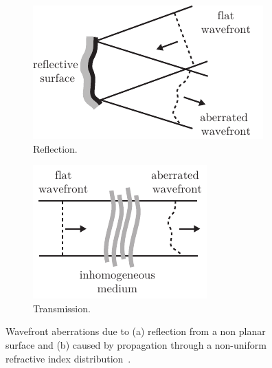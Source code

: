 \begin{figure}[tbh]
       \centering
        \begin{subfigure}[b]{0.4\textwidth}
                \includegraphics[width=\textwidth]{images/wavefront_distortions_reflection}
                \caption{Reflection.}
                \label{fig:abberation_reflection}
        \end{subfigure}
				\hspace{1em}
        \begin{subfigure}[b]{0.3\textwidth}
                \includegraphics[width=\textwidth]{images/wavefront_distortions_transmission}
                \caption{Transmission.}
                \label{fig:abberation_trans}
        \end{subfigure}
        \caption{Wavefront aberrations due to (a) reflection from a non 
planar surface and (b)  caused by propagation through a non-uniform 
refractive index distribution~\cite{AOM_basic_ref}.}
\label{fig:abberations}
\end{figure} 


